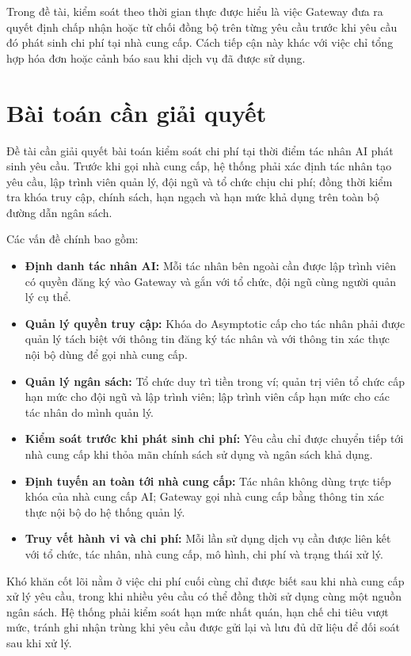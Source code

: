 Trong đề tài, kiểm soát theo thời gian thực được hiểu là việc Gateway đưa ra quyết định chấp nhận hoặc từ chối đồng bộ trên từng yêu cầu trước khi yêu cầu đó phát sinh chi phí tại nhà cung cấp. Cách tiếp cận này khác với việc chỉ tổng hợp hóa đơn hoặc cảnh báo sau khi dịch vụ đã được sử dụng.

\section{Bài toán cần giải quyết}

Đề tài cần giải quyết bài toán kiểm soát chi phí tại thời điểm tác nhân AI phát sinh yêu cầu. Trước khi gọi nhà cung cấp, hệ thống phải xác định tác nhân tạo yêu cầu, lập trình viên quản lý, đội ngũ và tổ chức chịu chi phí; đồng thời kiểm tra khóa truy cập, chính sách, hạn ngạch và hạn mức khả dụng trên toàn bộ đường dẫn ngân sách.

Các vấn đề chính bao gồm:

\begin{itemize}
    \item \textbf{Định danh tác nhân AI:} Mỗi tác nhân bên ngoài cần được lập trình viên có quyền đăng ký vào Gateway và gắn với tổ chức, đội ngũ cùng người quản lý cụ thể.
    \item \textbf{Quản lý quyền truy cập:} Khóa do Asymptotic cấp cho tác nhân phải được quản lý tách biệt với thông tin đăng ký tác nhân và với thông tin xác thực nội bộ dùng để gọi nhà cung cấp.
    \item \textbf{Quản lý ngân sách:} Tổ chức duy trì tiền trong ví; quản trị viên tổ chức cấp hạn mức cho đội ngũ và lập trình viên; lập trình viên cấp hạn mức cho các tác nhân do mình quản lý.
    \item \textbf{Kiểm soát trước khi phát sinh chi phí:} Yêu cầu chỉ được chuyển tiếp tới nhà cung cấp khi thỏa mãn chính sách sử dụng và ngân sách khả dụng.
    \item \textbf{Định tuyến an toàn tới nhà cung cấp:} Tác nhân không dùng trực tiếp khóa của nhà cung cấp AI; Gateway gọi nhà cung cấp bằng thông tin xác thực nội bộ do hệ thống quản lý.
    \item \textbf{Truy vết hành vi và chi phí:} Mỗi lần sử dụng dịch vụ cần được liên kết với tổ chức, tác nhân, nhà cung cấp, mô hình, chi phí và trạng thái xử lý.
\end{itemize}

Khó khăn cốt lõi nằm ở việc chi phí cuối cùng chỉ được biết sau khi nhà cung cấp xử lý yêu cầu, trong khi nhiều yêu cầu có thể đồng thời sử dụng cùng một nguồn ngân sách. Hệ thống phải kiểm soát hạn mức nhất quán, hạn chế chi tiêu vượt mức, tránh ghi nhận trùng khi yêu cầu được gửi lại và lưu đủ dữ liệu để đối soát sau khi xử lý.

